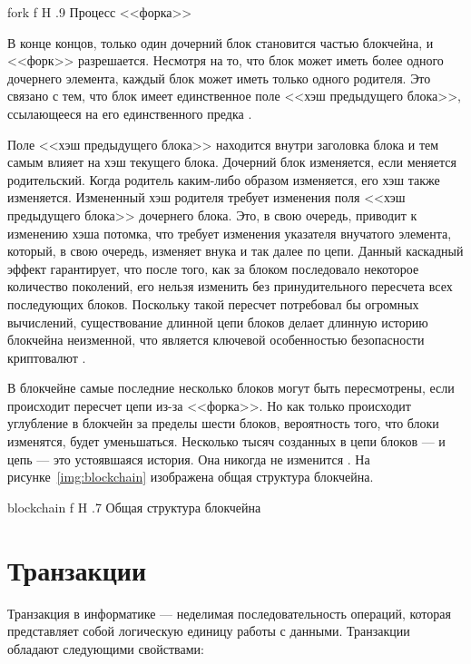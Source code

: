 \documentclass{bmstu}
\begin{document}
    {fork}
    {f}
    {H}
    {.9\textwidth}
    {Процесс <<форка>> \cite{Sheikh2018}}

\pagebreak
В конце концов, только один дочерний блок становится частью блокчейна, и <<форк>> разрешается. 
Несмотря на то, что блок может иметь более одного дочернего элемента, каждый блок может иметь только одного родителя. 
Это связано с тем, что блок имеет единственное поле <<хэш предыдущего блока>>, ссылающееся на его единственного предка \cite[163]{Antonopoulos2010}.

Поле <<хэш предыдущего блока>> находится внутри заголовка блока и тем самым влияет на хэш текущего блока. 
Дочерний блок изменяется, если меняется родительский. 
Когда родитель каким-либо образом изменяется, его хэш также изменяется. 
Измененный хэш родителя требует изменения поля <<хэш предыдущего блока>> дочернего блока. 
Это, в свою очередь, приводит к изменению хэша потомка, что требует изменения указателя внучатого элемента, который, в свою очередь, изменяет внука и так далее по цепи. 
Данный каскадный эффект гарантирует, что после того, как за блоком последовало некоторое количество поколений, его нельзя изменить без принудительного пересчета всех последующих блоков. 
Поскольку такой пересчет потребовал бы огромных вычислений, существование длинной цепи блоков делает длинную историю блокчейна неизменной, что является ключевой особенностью безопасности криптовалют \cite[164]{Antonopoulos2010}.

В блокчейне самые последние несколько блоков могут быть пересмотрены, если происходит пересчет цепи из-за <<форка>>. 
Но как только происходит углубление в блокчейн за пределы шести блоков, вероятность того, что блоки изменятся, будет уменьшаться. 
Несколько тысяч созданных в цепи блоков --- и цепь --- это устоявшаяся история. Она никогда не изменится \cite[164]{Antonopoulos2010}. 
На рисунке~\ref{img:blockchain} изображена общая структура блокчейна.

    {blockchain}
    {f}
    {H}
    {.7\textwidth}
    {Общая структура блокчейна \cite{Ribera2018}}

\section{Транзакции}

Транзакция в информатике --- неделимая последовательность операций, которая представляет собой логическую единицу работы с данными. 
Транзакции обладают следующими свойствами:
\end{document}
